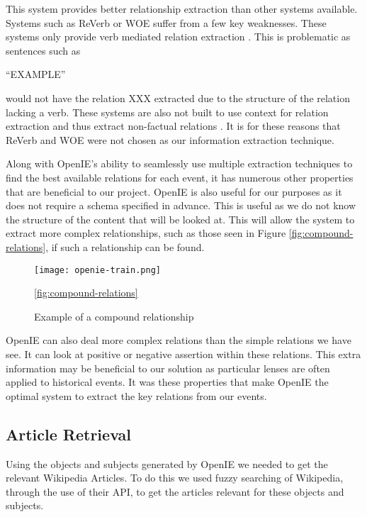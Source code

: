 \documentclass[bsc,frontabs,twoside,singlespacing,parskip,deptreport]{infthesis}     %
\begin{document}
This system provides better relationship extraction than other systems available. Systems such as
ReVerb or WOE suffer from a few key weaknesses. These systems only provide verb mediated relation extraction \cite{schmitz2012open}. This is problematic as sentences such as

``EXAMPLE''

would not have the relation XXX extracted due to the structure of the relation lacking a verb.
These systems are also not built to use context for relation extraction and thus extract non-factual relations \cite{schmitz2012open}.
It is for these reasons that ReVerb and WOE were not chosen as our information extraction technique.


Along with OpenIE's ability to seamlessly use multiple extraction techniques to find the best available
relations for each event, it has numerous other properties that are beneficial to our project.
OpenIE is also useful for our purposes as it does not require a schema specified in advance.
This is useful as we do not know the structure of the content that will be looked at.
This will allow the system to extract
more complex relationships, such as those seen in Figure \ref{fig:compound-relations}, if such
a relationship can be found.


\begin{figure}[h]
  \centering
  \texttt{[image: openie-train.png]}
  \caption{Example of a compound relationship \cite{OpenIE}}
  \ref{fig:compound-relations}
  \end{figure}

OpenIE can also deal more complex relations  than the simple relations we have see.
It can look at positive or negative assertion within these relations.
This extra information may be beneficial to our solution as particular lenses are often applied to historical events.
It was these properties that make OpenIE the optimal system to extract the key relations from our events.


\subsection{Article Retrieval}
Using the objects and subjects generated by OpenIE we needed to get the relevant Wikipedia Articles.
To do this we used fuzzy searching of Wikipedia, through the use of their API, to get the articles relevant
for these objects and subjects.
\end{document}
